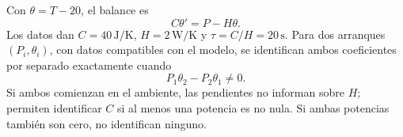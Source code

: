 Con \(\theta=T-20\), el balance es
\[
C\theta'=P-H\theta.
\]
Los datos dan \(C=40\,\mathrm{J/K}\), \(H=2\,\mathrm{W/K}\) y \(\tau=C/H=20\,\mathrm s\). Para dos arranques \((P_i,\theta_i)\), con datos compatibles con el modelo, se identifican ambos coeficientes por separado exactamente cuando
\[
P_1\theta_2-P_2\theta_1\ne0.
\]
Si ambos comienzan en el ambiente, las pendientes no informan sobre \(H\); permiten identificar \(C\) si al menos una potencia es no nula. Si ambas potencias también son cero, no identifican ninguno.
